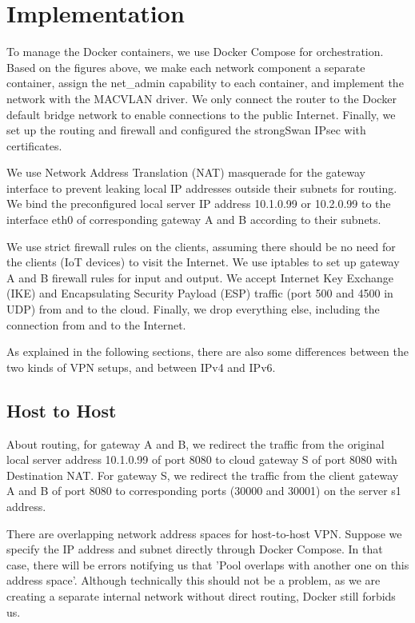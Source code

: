 \documentclass[article]{aaltoseries}
\begin{document}
\section{Implementation}

To manage the Docker containers, we use Docker Compose for orchestration. Based on the figures above, we make each network component a separate container, assign the net\_admin capability to each container, and implement the network with the MACVLAN driver. We only connect the router to the Docker default bridge network to enable connections to the public Internet. Finally, we set up the routing and firewall and configured the strongSwan IPsec with certificates.

We use Network Address Translation (NAT) masquerade for the gateway interface to prevent leaking local IP addresses outside their subnets for routing. We bind the preconfigured local server IP address 10.1.0.99 or 10.2.0.99 to the interface eth0 of corresponding gateway A and B according to their subnets.

We use strict firewall rules on the clients, assuming there should be no need for the clients (IoT devices) to visit the Internet. We use iptables to set up gateway A and B firewall rules for input and output. We accept Internet Key Exchange (IKE) and Encapsulating Security Payload (ESP) traffic (port 500 and 4500 in UDP) from and to the cloud. Finally, we drop everything else, including the connection from and to the Internet.

As explained in the following sections, there are also some differences between the two kinds of VPN setups, and between IPv4 and IPv6.

\subsection{Host to Host}

About routing, for gateway A and B, we redirect the traffic from the original local server address 10.1.0.99 of port 8080 to cloud gateway S of port 8080 with Destination NAT. For gateway S, we redirect the traffic from the client gateway A and B of port 8080 to corresponding ports (30000 and 30001) on the server s1 address.

There are overlapping network address spaces for host-to-host VPN. Suppose we specify the IP address and subnet directly through Docker Compose. In that case, there will be errors notifying us that 'Pool overlaps with another one on this address space'. Although technically this should not be a problem, as we are creating a separate internal network without direct routing, Docker still forbids us.
\end{document}
